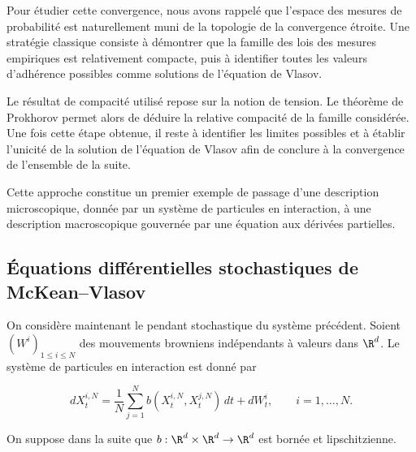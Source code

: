 Pour étudier cette convergence, nous avons rappelé que l'espace des mesures de probabilité est naturellement muni de la topologie de la convergence étroite. Une stratégie classique consiste à démontrer que la famille des lois des mesures empiriques est relativement compacte, puis à identifier toutes les valeurs d'adhérence possibles comme solutions de l'équation de Vlasov.

\begin{important}

	Le résultat de compacité utilisé repose sur la notion de tension.
	Le théorème de Prokhorov permet alors de déduire la relative compacité de la famille considérée. Une fois cette étape obtenue, il reste à identifier les limites possibles et à établir l'unicité de la solution de l'équation de Vlasov afin de conclure à la convergence de l'ensemble de la suite.
\end{important}

Cette approche constitue un premier exemple de passage d'une description microscopique, donnée par un système de particules en interaction, à une description macroscopique gouvernée par une équation aux dérivées partielles.

\subsection{Équations différentielles stochastiques de McKean--Vlasov}

On considère maintenant le pendant stochastique du système précédent. Soient
$(W^i)_{1\leq i\leq N}$ des mouvements browniens indépendants à valeurs dans $\R^d$.
Le système de particules en interaction est donné par
\begin{important}
	\begin{equation}
		dX_t^{i,N}
		=
		\frac1N
		\sum_{j=1}^{N}
		b(X_t^{i,N},X_t^{j,N})\,dt
		+
		dW_t^i,
		\qquad i=1,\dots,N.
		\label{eq:systeme_particules_stochastique}
	\end{equation}
\end{important}
On suppose dans la suite que $b:\R^d\times\R^d\to\R^d$ est bornée et lipschitzienne.

